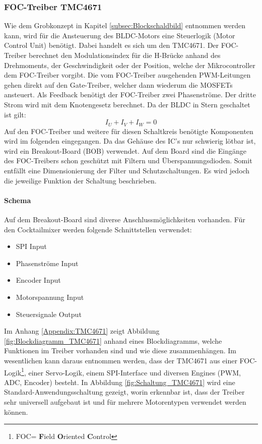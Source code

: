 \clearpage
\subsubsection{FOC-Treiber TMC4671}
\label{subsubsec:FOC-Treiber_TMC4671}

Wie dem Grobkonzept in Kapitel \ref{subsec:Blockschaldbild} entnommen werden kann, wird für die Ansteuerung des BLDC-Motors eine Steuerlogik (Motor Control Unit) benötigt. Dabei handelt es sich um den TMC4671.
Der FOC-Treiber berechnet den Modulationsindex für die H-Brücke anhand des Drehmoments, der Geschwindigkeit oder der Position, welche der Mikrocontroller dem FOC-Treiber vorgibt. Die vom FOC-Treiber ausgehenden PWM-Leitungen gehen direkt auf den Gate-Treiber, welcher dann wiederum die MOSFETs ansteuert. Als Feedback benötigt der FOC-Treiber zwei Phasenströme. Der dritte Strom wird mit dem Knotengesetz berechnet. Da der BLDC in Stern geschaltet ist gilt:
\begin{equation}
I_U + I_V + I_W = 0
\end{equation}
Auf den FOC-Treiber und weitere für diesen Schaltkreis benötigte Komponenten wird im folgenden eingegangen.
Da das Gehäuse des IC's nur schwierig lötbar ist, wird ein Breakout-Board (BOB) verwendet.
Auf dem Board sind die Eingänge des FOC-Treibers schon geschützt mit Filtern und Überspannungsdioden. Somit entfällt eine Dimensionierung der Filter und Schutzschaltungen. Es wird jedoch die jeweilige Funktion der Schaltung beschrieben.

\paragraph{Schema}\label{par:Schaltungsaufbau_TMC4671}\mbox{}

Auf dem Breakout-Board sind diverse Anschlussmöglichkeiten vorhanden. Für den Cocktailmixer werden folgende Schnittstellen verwendet:

\begin{itemize}
\item SPI Input
\item Phasenströme Input
\item Encoder Input
\item Motorspannung Input
\item Steuersignale Output
\end{itemize}

Im Anhang \ref{Appendix:TMC4671} zeigt Abbildung \ref{fig:Blockdiagramm_TMC4671} anhand eines Blockdiagramms, welche Funktionen im Treiber vorhanden sind und wie diese zusammenhängen. Im wesentlichen kann daraus entnommen werden, dass der TMC4671 aus einer FOC-Logik\footnote{FOC= \textbf{F}ield \textbf{O}riented \textbf{C}ontrol}, einer Servo-Logik, einem SPI-Interface und diversen Engines (PWM, ADC, Encoder) besteht. In Abbildung \ref{fig:Schaltung_TMC4671} wird eine Standard-Anwendungsschaltung gezeigt, worin erkennbar ist, dass der Treiber sehr universell aufgebaut ist und für mehrere Motorentypen verwendet werden können.

